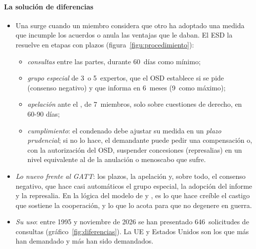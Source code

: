 \documentclass[11pt]{article}
\begin{document}
\begin{infografia}[H]
\centering
\caption{Estructura de la Organización Mundial del Comercio}\label{figu:estructura}
\end{infografia}

\paragraph{La solución de diferencias}

\begin{itemize}
\item Una  surge cuando un miembro considera que otro ha adoptado una medida que incumple los acuerdos o anula las ventajas que le daban. El ESD la resuelve en etapas con plazos (figura~\ref{figu:procedimiento}):
  \begin{itemize}
  \item \emph{consultas} entre las partes, durante 60~días como mínimo;
  \item \emph{grupo especial} de 3~o 5~expertos, que el OSD establece si se pide (consenso negativo) y que informa en 6~meses (9~como máximo);
  \item \emph{apelación} ante el , de 7~miembros, solo sobre cuestiones de derecho, en 60-90 días;
  \item \emph{cumplimiento}: el condenado debe ajustar su medida en un \emph{plazo prudencial}; si no lo hace, el demandante puede pedir una compensación o, con la autorización del OSD, suspender concesiones (represalias) en un nivel equivalente al de la anulación o menoscabo que sufre\nocite{OMC1994ESD}.
  \end{itemize}
\item \emph{Lo nuevo frente al GATT}: los plazos, la apelación y, sobre todo, el consenso negativo, que hace casi automáticos el grupo especial, la adopción del informe y la represalia. En la lógica del modelo de  y , es lo que hace creíble el castigo que sostiene la cooperación, y lo que lo acota para que no degenere en guerra.
\item \emph{Su uso}: entre 1995 y noviembre de 2026 se han presentado 646~solicitudes de consultas (gráfico~\ref{fig:diferencias}). La UE y Estados Unidos son los que más han demandado y más han sido demandados.
\end{itemize}
\end{document}
